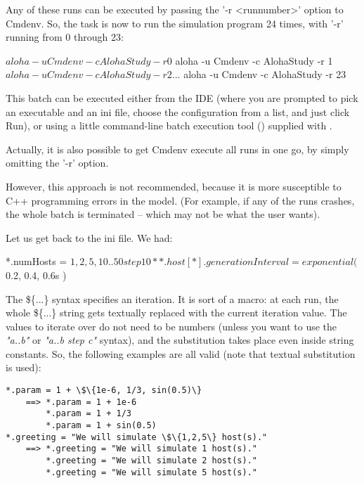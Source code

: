 Any of these runs can be executed by passing the '-r
<runnumber>' option to Cmdenv.
So, the task is now to run the simulation program 24 times, with
'-r' running from 0 through 23:

\begin{commandline}
$ aloha -u Cmdenv -c AlohaStudy -r 0
$ aloha -u Cmdenv -c AlohaStudy -r 1
$ aloha -u Cmdenv -c AlohaStudy -r 2
...
$ aloha -u Cmdenv -c AlohaStudy -r 23
\end{commandline}


This batch can be executed either from the {\opp} IDE (where you are
prompted to pick an executable and an ini file, choose the configuration
from a list, and just click Run), or using a little command-line
batch execution tool () supplied with {\opp}.

Actually, it is also possible to get Cmdenv execute all runs in one go,
by simply omitting the '-r' option.




However, this approach is not recommended, because it is more
susceptible to C++ programming errors in the model. (For example, if
any of the runs crashes, the whole batch is terminated -- which may
not be what the user wants).

Let us get back to the ini file. We had:

\begin{inifile}
*.numHosts = ${1, 2, 5, 10..50 step 10}
**.host[*].generationInterval = exponential( ${0.2, 0.4, 0.6}s )
\end{inifile}


The \$\{...\} syntax specifies an iteration. It is sort of a macro: at
each run, the whole \$\{...\} string gets textually replaced with the
current iteration value. The values to iterate over do not need to be
numbers (unless you want to use the \textit{"a..b"} or
\textit{"a..b step c"} syntax), and the
substitution takes place even inside string constants. So, the
following examples are all valid (note that textual substitution is
used):

\begin{Verbatim}[commandchars=\\\{\}]
*.param = 1 + \$\{1e-6, 1/3, sin(0.5)\}
    ==> *.param = 1 + 1e-6
        *.param = 1 + 1/3
        *.param = 1 + sin(0.5)
*.greeting = "We will simulate \$\{1,2,5\} host(s)."
    ==> *.greeting = "We will simulate 1 host(s)."
        *.greeting = "We will simulate 2 host(s)."
        *.greeting = "We will simulate 5 host(s)."
\end{Verbatim}


